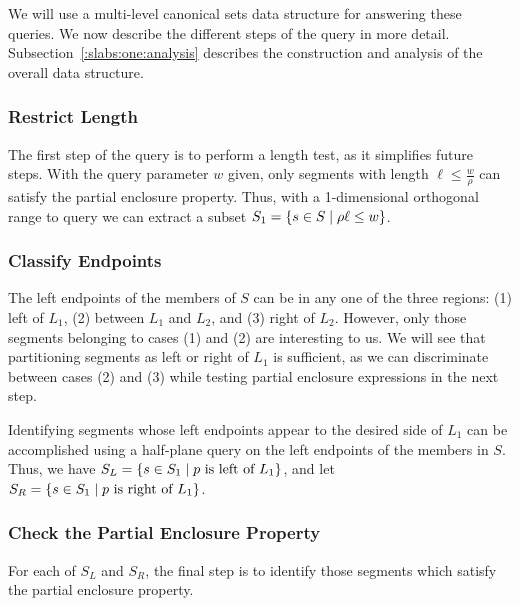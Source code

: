 We will use a multi-level canonical sets data structure 
\cite{chan2012} for answering these queries. 
We now describe the different steps of the query in more detail. 
Subsection~\ref{:slabs:one:analysis} describes the construction 
and analysis of the overall data structure.


\subsubsection*{Restrict Length}
The first step of the query is to perform a length test, as it 
simplifies future steps. With the query parameter $w$ given, 
only segments with length $\ell \leq \frac{w}{\rho}$ can satisfy 
the partial enclosure property. Thus, with a 1-dimensional 
orthogonal range to query we can extract a subset 
$S_1 = \{ s\in S \;|\; \rho \ell \leq w \}$.


\subsubsection*{Classify Endpoints}
The left endpoints of the members of $S$ can be in any one of the three 
regions: (1) left of $L_1$, (2) between $L_1$ and $L_2$, and (3) right 
of $L_2$. However, only those segments belonging to cases (1) and (2) 
are interesting to us. We will see that partitioning segments as left 
or right of $L_1$ is sufficient, as we can discriminate between cases 
(2) and (3) while testing partial enclosure expressions in the next step.

Identifying segments whose left endpoints appear to the desired side of 
$L_1$ can be accomplished using a half-plane query on the left endpoints 
of the members in $S$. Thus, we have $S_L = \{ s \in S_1 \;|\; p \text{ is 
left of } L_1 \}$, and let $S_R = \{ s \in S_1 \;|\; p \text{ is right of 
} L_1 \}$.


\subsubsection*{Check the Partial Enclosure Property}
For each of $S_L$ and $S_R$, the final step is to identify those segments 
which satisfy the partial enclosure property.

